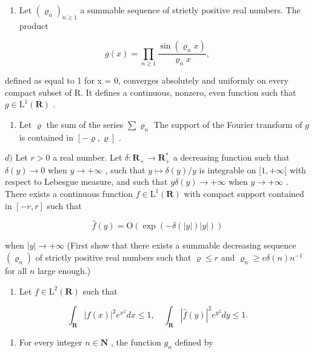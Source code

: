 \begin{enumerate}
\def\labelenumi{\alph{enumi})}
\setcounter{enumi}{1}
\tightlist
\item
  Let \((\varrho_{n})_{n\geqslant1}\) a summable sequence of strictly positive real numbers. The product
\end{enumerate}

\[
g (x) = \prod_ {n \geqslant 1} \frac {\sin (\varrho_ {n} x)}{\varrho_ {n} x},
\]

defined as equal to 1 for x = 0, converges absolutely and uniformly on every compact subset of R. It defines a continuous, nonzero, even function such that \(g \in \mathrm{L}^{1}(\mathbf{R})\) .

\begin{enumerate}
\def\labelenumi{\alph{enumi})}
\setcounter{enumi}{2}
\tightlist
\item
  Let \(\varrho\) the sum of the series \(\sum \varrho_{n}\) The support of the Fourier transform of \(g\) is contained in \([- \varrho, \varrho]\) .
\end{enumerate}

\(d)\) Let \(r > 0\) a real number. Let \(\delta: \mathbf{R}_{+} \to \mathbf{R}_{+}^{*}\) a decreasing function such that \(\delta(y) \to 0\) when \(y \to +\infty\) , such that \(y \mapsto \delta(y)/y\) is integrable on \([1, +\infty[\) with respect to Lebesgue measure, and such that \(y\delta(y) \to +\infty\) when \(y \to +\infty\) . There exists a continuous function \(f \in \mathrm{L}^{1}(\mathbf{R})\) with compact support contained in \([-r, r]\) such that

\[
\widehat {f} (y) = \mathrm{O} (\exp (- \delta (| y |) | y |))
\]

when \(|y| \to +\infty\) (First show that there exists a summable decreasing sequence \((\varrho_n)\) of strictly positive real numbers such that \(\varrho \leqslant r\) and \(\varrho_n \geqslant e\delta(n)n^{-1}\) for all \(n\) large enough.)

\begin{enumerate}
\def\labelenumi{\arabic{enumi})}
\setcounter{enumi}{28}
\tightlist
\item
  Let \(f\in \mathrm{L}^2 (\mathbf{R})\) such that
\end{enumerate}

\[
\int_ {\mathbf {R}} | f (x) | ^ {2} e ^ {x ^ {2}} d x \leqslant 1, \quad \int_ {\mathbf {R}} | \widehat {f} (y) | ^ {2} e ^ {y ^ {2}} d y \leqslant 1.
\]

\begin{enumerate}
\def\labelenumi{\alph{enumi})}
\tightlist
\item
  For every integer \(n \in \mathbf{N}\) , the function \(g_n\) defined by
\end{enumerate}

